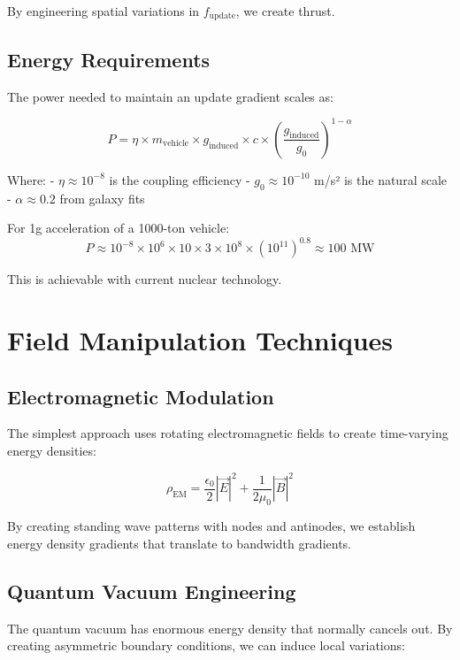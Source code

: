 \documentclass[12pt,letterpaper]{book}
\theoremstyle{definition}
\theoremstyle{plain}
\theoremstyle{remark}
\begin{document}
{{{{{By engineering spatial variations in $f_{\text{update}}$, we create thrust.

\subsection{Energy Requirements}

The power needed to maintain an update gradient scales as:

\begin{equation}
P = \eta \times m_{\text{vehicle}} \times g_{\text{induced}} \times c \times \left(\frac{g_{\text{induced}}}{g_0}\right)^{1-\alpha}
\end{equation}

Where:
- $\eta \approx 10^{-8}$ is the coupling efficiency
- $g_0 \approx 10^{-10}$ m/s² is the natural scale
- $\alpha \approx 0.2$ from galaxy fits

For 1g acceleration of a 1000-ton vehicle:
\begin{equation}
P \approx 10^{-8} \times 10^6 \times 10 \times 3\times10^8 \times (10^{11})^{0.8} \approx 100 \text{ MW}
\end{equation}

This is achievable with current nuclear technology.

\section{Field Manipulation Techniques}

\subsection{Electromagnetic Modulation}

The simplest approach uses rotating electromagnetic fields to create time-varying energy densities:

\begin{equation}
\rho_{\text{EM}} = \frac{\epsilon_0}{2}|\vec{E}|^2 + \frac{1}{2\mu_0}|\vec{B}|^2
\end{equation}

By creating standing wave patterns with nodes and antinodes, we establish energy density gradients that translate to bandwidth gradients.

\subsection{Quantum Vacuum Engineering}

The quantum vacuum has enormous energy density that normally cancels out. By creating asymmetric boundary conditions, we can induce local variations:

}}}}}
\end{document}
